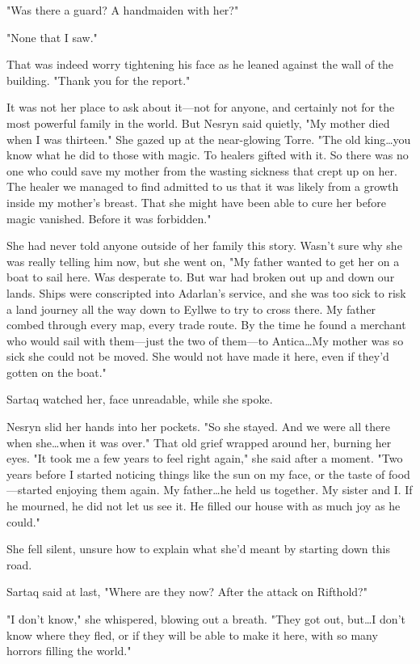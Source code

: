 "Was there a guard?
A handmaiden with her?"

"None that I saw."

That was indeed worry tightening his face as he leaned against the wall of the building.
"Thank you for the report."

It was not her place to ask about it---not for anyone, and certainly not for the most powerful family in the world.
But Nesryn said quietly, "My mother died when I was thirteen."
She gazed up at the near-glowing Torre.
"The old king\ldots you know what he did to those with magic.
To healers gifted with it.
So there was no one who could save my mother from the wasting sickness that crept up on her.
The healer we managed to find admitted to us that it was likely from a growth inside my mother's breast.
That she might have been able to cure her before magic vanished.
Before it was forbidden."

She had never told anyone outside of her family this story.
Wasn't sure why she was really telling him now, but she went on, "My father wanted to get her on a boat to sail here.
Was desperate to.
But war had broken out up and down our lands.
Ships were conscripted into Adarlan's service, and she was too sick to risk a land journey all the way down to Eyllwe to try to cross there.
My father combed through every map, every trade route.
By the time he found a merchant who would sail with them---just the two of them---to Antica\ldots My mother was so sick she could not be moved.
She would not have made it here, even if they'd gotten on the boat."

Sartaq watched her, face unreadable, while she spoke.

Nesryn slid her hands into her pockets.
"So she stayed.
And we were all there when she\ldots when it was over."
That old grief wrapped around her, burning her eyes.
"It took me a few years to feel right again," she said after a moment.
"Two years before I started noticing things like the sun on my face, or the taste of food ---started enjoying them again.
My father\ldots he held us together.
My sister and I.
If he mourned, he did not let us see it.
He filled our house with as much joy as he could."

She fell silent, unsure how to explain what she'd meant by starting down this road.

Sartaq said at last, "Where are they now?
After the attack on Rifthold?"

"I don't know," she whispered, blowing out a breath.
"They got out, but\ldots I don't know where they fled, or if they will be able to make it here, with so many horrors filling the world."

